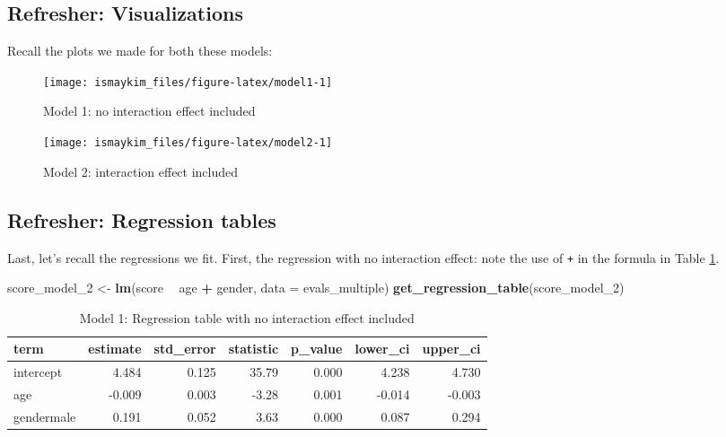 \documentclass[12pt, krantz2,]{krantz}
\makeatletter
\newenvironment{Shaded}{\begin{snugshade}}{\end{snugshade}}
\newcommand{\DataTypeTok}[1]{\textcolor[rgb]{0.27,0.27,0.27}{#1}}
\newcommand{\DecValTok}[1]{\textcolor[rgb]{0.06,0.06,0.06}{#1}}
\newcommand{\KeywordTok}[1]{\textcolor[rgb]{0.27,0.27,0.27}{\textbf{#1}}}
\newcommand{\NormalTok}[1]{#1}
\newcommand{\OperatorTok}[1]{\textcolor[rgb]{0.43,0.43,0.43}{\textbf{#1}}}
\newcommand{\StringTok}[1]{\textcolor[rgb]{0.5,0.5,0.5}{#1}}
\newenvironment{kframe}{%
\medskip{}
\setlength{\fboxsep}{.8em}
 \def\at@end@of@kframe{}%
 \ifinner\ifhmode%
  \def\at@end@of@kframe{\end{minipage}}%
  \begin{minipage}{\columnwidth}%
 \fi\fi%
 \def\FrameCommand##1{\hskip\@totalleftmargin \hskip-\fboxsep
 \colorbox{shadecolor}{##1}\hskip-\fboxsep
     \hskip-\linewidth \hskip-\@totalleftmargin \hskip\columnwidth}%
 \MakeFramed {\advance\hsize-\width
   \@totalleftmargin\z@ \linewidth\hsize
   \@setminipage}}%
 {\par\unskip\endMakeFramed%
 \at@end@of@kframe}
\renewenvironment{Shaded}{\begin{kframe}}{\end{kframe}}
\makeatother
\begin{document}
\hypertarget{refresher-visualizations}{%
\subsection{Refresher: Visualizations}\label{refresher-visualizations}}

Recall the plots we made for both these models:

\begin{figure}

{\centering \texttt{[image: ismaykim\_files/figure-latex/model1-1]} 

}

\caption{Model 1: no interaction effect included}\label{fig:model1}
\end{figure}

\begin{figure}

{\centering \texttt{[image: ismaykim\_files/figure-latex/model2-1]} 

}

\caption{Model 2: interaction effect included}\label{fig:model2}
\end{figure}

\hypertarget{refresher-regression-tables}{%
\subsection{Refresher: Regression tables}\label{refresher-regression-tables}}

Last, let's recall the regressions we fit. First, the regression with no
interaction effect: note the use of \texttt{+} in the formula in Table \ref{tab:modelmultireg}.

\begin{Shaded}
\begin{Highlighting}[]
\NormalTok{score_model_}\DecValTok{2}\NormalTok{ <-}\StringTok{ }\KeywordTok{lm}\NormalTok{(score }\OperatorTok{~}\StringTok{ }\NormalTok{age }\OperatorTok{+}\StringTok{ }\NormalTok{gender, }\DataTypeTok{data =}\NormalTok{ evals_multiple)}
\KeywordTok{get_regression_table}\NormalTok{(score_model_}\DecValTok{2}\NormalTok{)}
\end{Highlighting}
\end{Shaded}

\begin{table}[H]

\caption{\label{tab:modelmultireg}Model 1: Regression table with no interaction effect included}
\centering
\fontsize{10}{12}\selectfont
\begin{tabular}{lrrrrrr}
\toprule
term & estimate & std\_error & statistic & p\_value & lower\_ci & upper\_ci\\
\midrule
intercept & 4.484 & 0.125 & 35.79 & 0.000 & 4.238 & 4.730\\
age & -0.009 & 0.003 & -3.28 & 0.001 & -0.014 & -0.003\\
gendermale & 0.191 & 0.052 & 3.63 & 0.000 & 0.087 & 0.294\\
\bottomrule
\end{tabular}
\end{table}
\end{document}
